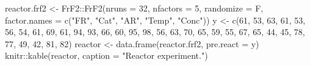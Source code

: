 \documentclass[
]{book}
\newenvironment{Shaded}{\begin{snugshade}}{\end{snugshade}}
\newcommand{\AttributeTok}[1]{\textcolor[rgb]{0.77,0.63,0.00}{#1}}
\newcommand{\DecValTok}[1]{\textcolor[rgb]{0.00,0.00,0.81}{#1}}
\newcommand{\FunctionTok}[1]{\textcolor[rgb]{0.00,0.00,0.00}{#1}}
\newcommand{\NormalTok}[1]{#1}
\newcommand{\OtherTok}[1]{\textcolor[rgb]{0.56,0.35,0.01}{#1}}
\newcommand{\SpecialCharTok}[1]{\textcolor[rgb]{0.00,0.00,0.00}{#1}}
\newcommand{\StringTok}[1]{\textcolor[rgb]{0.31,0.60,0.02}{#1}}
\theoremstyle{definition}
\theoremstyle{definition}
\theoremstyle{definition}
\theoremstyle{definition}
\theoremstyle{remark}
\begin{document}
\begin{enumerate}
\begin{Shaded}
\begin{Highlighting}[]
\NormalTok{reactor.frf2 }\OtherTok{\textless{}{-}}\NormalTok{ FrF2}\SpecialCharTok{::}\FunctionTok{FrF2}\NormalTok{(}\AttributeTok{nruns =} \DecValTok{32}\NormalTok{, }\AttributeTok{nfactors =} \DecValTok{5}\NormalTok{, }\AttributeTok{randomize =}\NormalTok{ F,}
                           \AttributeTok{factor.names =} \FunctionTok{c}\NormalTok{(}\StringTok{"FR"}\NormalTok{, }\StringTok{"Cat"}\NormalTok{, }\StringTok{"AR"}\NormalTok{, }\StringTok{"Temp"}\NormalTok{, }\StringTok{"Conc"}\NormalTok{))}
\NormalTok{y }\OtherTok{\textless{}{-}} \FunctionTok{c}\NormalTok{(}\DecValTok{61}\NormalTok{, }\DecValTok{53}\NormalTok{, }\DecValTok{63}\NormalTok{, }\DecValTok{61}\NormalTok{, }\DecValTok{53}\NormalTok{, }\DecValTok{56}\NormalTok{, }\DecValTok{54}\NormalTok{, }\DecValTok{61}\NormalTok{, }\DecValTok{69}\NormalTok{, }\DecValTok{61}\NormalTok{, }\DecValTok{94}\NormalTok{, }\DecValTok{93}\NormalTok{, }\DecValTok{66}\NormalTok{, }\DecValTok{60}\NormalTok{, }\DecValTok{95}\NormalTok{, }\DecValTok{98}\NormalTok{, }\DecValTok{56}\NormalTok{, }\DecValTok{63}\NormalTok{,}
       \DecValTok{70}\NormalTok{, }\DecValTok{65}\NormalTok{, }\DecValTok{59}\NormalTok{, }\DecValTok{55}\NormalTok{, }\DecValTok{67}\NormalTok{, }\DecValTok{65}\NormalTok{, }\DecValTok{44}\NormalTok{, }\DecValTok{45}\NormalTok{, }\DecValTok{78}\NormalTok{, }\DecValTok{77}\NormalTok{, }\DecValTok{49}\NormalTok{, }\DecValTok{42}\NormalTok{, }\DecValTok{81}\NormalTok{, }\DecValTok{82}\NormalTok{)}
\NormalTok{reactor }\OtherTok{\textless{}{-}} \FunctionTok{data.frame}\NormalTok{(reactor.frf2, }\AttributeTok{pre.react =}\NormalTok{ y)}
\NormalTok{knitr}\SpecialCharTok{::}\FunctionTok{kable}\NormalTok{(reactor, }\AttributeTok{caption =} \StringTok{"Reactor experiment."}\NormalTok{)}
\end{Highlighting}
\end{Shaded}

  \begin{table}


\end{table}
\end{enumerate}
\end{document}
